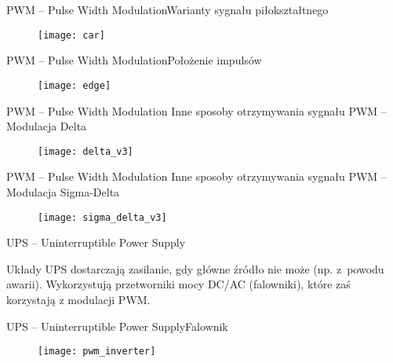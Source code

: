 \documentclass[11pt]{beamer}
\begin{document}
\begin{frame}{PWM -- Pulse Width Modulation}{Warianty sygnału piłokształtnego}

\begin{figure}[htbp!]
	\centering
	\texttt{[image: car]}
\end{figure}

\end{frame}


\begin{frame}{PWM -- Pulse Width Modulation}{Położenie impulsów}

\begin{figure}[htbp!]
	\centering
	\texttt{[image: edge]}
\end{figure}

\end{frame}


\begin{frame}{PWM -- Pulse Width Modulation}
	{Inne sposoby otrzymywania sygnału PWM -- Modulacja Delta}

\begin{figure}[htbp!]
	\centering
	\texttt{[image: delta\_v3]}
\end{figure}

\end{frame}


\begin{frame}{PWM -- Pulse Width Modulation}
	{Inne sposoby otrzymywania sygnału PWM -- Modulacja Sigma-Delta}

\begin{figure}[htbp!]
	\centering
	\texttt{[image: sigma\_delta\_v3]}
\end{figure}

\end{frame}


\begin{frame}{UPS -- Uninterruptible Power Supply}

Układy UPS dostarczają zasilanie, gdy główne źródło nie może (np. z~powodu awarii).
Wykorzystują przetworniki mocy DC/AC (falowniki), które zaś korzystają z modulacji PWM.

\end{frame}


\begin{frame}{UPS -- Uninterruptible Power Supply}{Falownik}

\begin{figure}[htbp!]
	\centering
	\texttt{[image: pwm\_inverter]}
\end{figure}

\end{frame}
\end{document}
